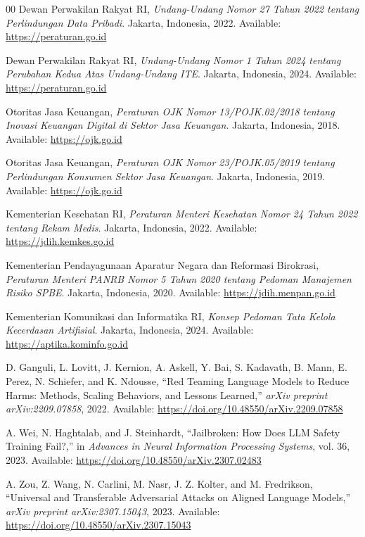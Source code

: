 \documentclass[conference]{IEEEtran}
\begin{document}
\begin{thebibliography}{00}
 Dewan Perwakilan Rakyat RI, \textit{Undang-Undang Nomor 27 Tahun 2022 tentang Perlindungan Data Pribadi}. Jakarta, Indonesia, 2022. Available: \url{https://peraturan.go.id}

 Dewan Perwakilan Rakyat RI, \textit{Undang-Undang Nomor 1 Tahun 2024 tentang Perubahan Kedua Atas Undang-Undang ITE}. Jakarta, Indonesia, 2024. Available: \url{https://peraturan.go.id}

 Otoritas Jasa Keuangan, \textit{Peraturan OJK Nomor 13/POJK.02/2018 tentang Inovasi Keuangan Digital di Sektor Jasa Keuangan}. Jakarta, Indonesia, 2018. Available: \url{https://ojk.go.id}

 Otoritas Jasa Keuangan, \textit{Peraturan OJK Nomor 23/POJK.05/2019 tentang Perlindungan Konsumen Sektor Jasa Keuangan}. Jakarta, Indonesia, 2019. Available: \url{https://ojk.go.id}

 Kementerian Kesehatan RI, \textit{Peraturan Menteri Kesehatan Nomor 24 Tahun 2022 tentang Rekam Medis}. Jakarta, Indonesia, 2022. Available: \url{https://jdih.kemkes.go.id}

 Kementerian Pendayagunaan Aparatur Negara dan Reformasi Birokrasi, \textit{Peraturan Menteri PANRB Nomor 5 Tahun 2020 tentang Pedoman Manajemen Risiko SPBE}. Jakarta, Indonesia, 2020. Available: \url{https://jdih.menpan.go.id}

 Kementerian Komunikasi dan Informatika RI, \textit{Konsep Pedoman Tata Kelola Kecerdasan Artifisial}. Jakarta, Indonesia, 2024. Available: \url{https://aptika.kominfo.go.id}

 D. Ganguli, L. Lovitt, J. Kernion, A. Askell, Y. Bai, S. Kadavath, B. Mann, E. Perez, N. Schiefer, and K. Ndousse, ``Red Teaming Language Models to Reduce Harms: Methods, Scaling Behaviors, and Lessons Learned,'' \textit{arXiv preprint arXiv:2209.07858}, 2022. Available: \url{https://doi.org/10.48550/arXiv.2209.07858}

 A. Wei, N. Haghtalab, and J. Steinhardt, ``Jailbroken: How Does LLM Safety Training Fail?,'' in \textit{Advances in Neural Information Processing Systems}, vol. 36, 2023. Available: \url{https://doi.org/10.48550/arXiv.2307.02483}

 A. Zou, Z. Wang, N. Carlini, M. Nasr, J. Z. Kolter, and M. Fredrikson, ``Universal and Transferable Adversarial Attacks on Aligned Language Models,'' \textit{arXiv preprint arXiv:2307.15043}, 2023. Available: \url{https://doi.org/10.48550/arXiv.2307.15043}


\end{thebibliography}
\end{document}
